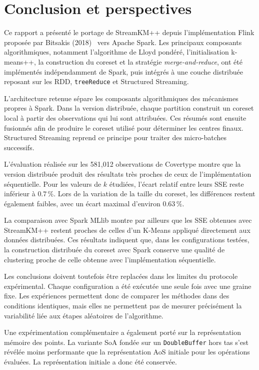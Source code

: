 
\chapter{Conclusion et perspectives}
\label{ch:conclusion}

Ce rapport a présenté le portage de StreamKM++ depuis l'implémentation Flink proposée par Bitsakis (2018)~\cite{bitsakis2018} vers Apache Spark. Les principaux composants algorithmiques, notamment l'algorithme de Lloyd pondéré, l'initialisation k-means++, la construction du coreset et la stratégie \emph{merge-and-reduce}, ont été implémentés indépendamment de Spark, puis intégrés à une couche distribuée reposant sur les RDD, \texttt{treeReduce} et Structured Streaming.

L'architecture retenue sépare les composants algorithmiques des mécanismes propres à Spark. Dans la version distribuée, chaque partition construit un coreset local à partir des observations qui lui sont attribuées. Ces résumés sont ensuite fusionnés afin de produire le coreset utilisé pour déterminer les centres finaux. Structured Streaming reprend ce principe pour traiter des micro-batches successifs.

L'évaluation réalisée sur les 581,012 observations de Covertype montre que la version distribuée produit des résultats très proches de ceux de l'implémentation séquentielle. Pour les valeurs de \(k\) étudiées, l'écart relatif entre leurs SSE reste inférieur à \(0.7\,\%\). Lors de la variation de la taille du coreset, les différences restent également faibles, avec un écart maximal d'environ \(0.63\,\%\).

La comparaison avec Spark MLlib montre par ailleurs que les SSE obtenues avec StreamKM++ restent proches de celles d'un K-Means appliqué directement aux données distribuées. Ces résultats indiquent que, dans les configurations testées, la construction distribuée du coreset avec Spark conserve une qualité de clustering proche de celle obtenue avec l'implémentation séquentielle.

Les conclusions doivent toutefois être replacées dans les limites du protocole expérimental. Chaque configuration a été exécutée une seule fois avec une graine fixe. Les expériences permettent donc de comparer les méthodes dans des conditions identiques, mais elles ne permettent pas de mesurer précisément la variabilité liée aux étapes aléatoires de l'algorithme.

Une expérimentation complémentaire a également porté sur la représentation mémoire des points. La variante SoA fondée sur un \texttt{DoubleBuffer} hors tas s'est révélée moins performante que la représentation AoS initiale pour les opérations évaluées. La représentation initiale a donc été conservée.

